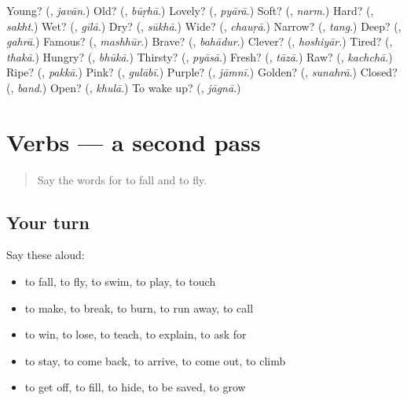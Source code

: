 \begin{tcolorbox}[breakable,colback=teal!4,colframe=teal!35!black,title={Before you move on}]
Young? (\textbf{}, \emph{javān}.) Old? (\textbf{}, \emph{būṛhā}.) Lovely? (\textbf{}, \emph{pyārā}.) Soft? (\textbf{}, \emph{narm}.) Hard? (\textbf{}, \emph{sakht}.) Wet? (\textbf{}, \emph{gīlā}.) Dry? (\textbf{}, \emph{sūkhā}.) Wide? (\textbf{}, \emph{chauṛā}.) Narrow? (\textbf{}, \emph{tang}.) Deep? (\textbf{}, \emph{gahrā}.) Famous? (\textbf{}, \emph{mashhūr}.) Brave? (\textbf{}, \emph{bahādur}.) Clever? (\textbf{}, \emph{hoshiyār}.) Tired? (\textbf{}, \emph{thakā}.) Hungry? (\textbf{}, \emph{bhūkā}.) Thirsty? (\textbf{}, \emph{pyāsā}.) Fresh? (\textbf{}, \emph{tāzā}.) Raw? (\textbf{}, \emph{kachchā}.) Ripe? (\textbf{}, \emph{pakkā}.) Pink? (\textbf{}, \emph{gulābī}.) Purple? (\textbf{}, \emph{jāmnī}.) Golden? (\textbf{}, \emph{sunahrā}.) Closed? (\textbf{}, \emph{band}.) Open? (\textbf{}, \emph{khulā}.) To wake up? (\textbf{}, \emph{jāgnā}.)
\end{tcolorbox}
\section[(dialogue)]{Verbs — a second pass}

\label{lesson:UR-R142-second-pass-verbs}



\begin{quote}
Say the words for to fall and to fly.
\end{quote}

\subsection*{Your turn}
Say these aloud:

\begin{itemize}
\raggedright
  \item to fall, to fly, to swim, to play, to touch
  \item to make, to break, to burn, to run away, to call
  \item to win, to lose, to teach, to explain, to ask for
  \item to stay, to come back, to arrive, to come out, to climb
  \item to get off, to fill, to hide, to be saved, to grow
\end{itemize}

